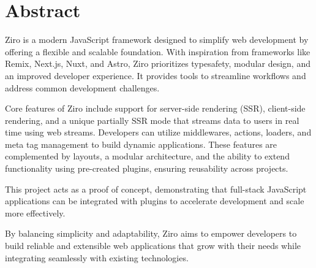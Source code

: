 \section{Abstract}

Ziro is a modern JavaScript framework designed to simplify web development by offering a flexible and scalable foundation. With inspiration from frameworks like Remix, Next.js, Nuxt, and Astro, Ziro prioritizes typesafety, modular design, and an improved developer experience. It provides tools to streamline workflows and address common development challenges.

Core features of Ziro include support for server-side rendering (SSR), client-side rendering, and a unique partially SSR mode that streams data to users in real time using web streams. Developers can utilize middlewares, actions, loaders, and meta tag management to build dynamic applications. These features are complemented by layouts, a modular architecture, and the ability to extend functionality using pre-created plugins, ensuring reusability across projects.

This project acts as a proof of concept, demonstrating that full-stack JavaScript applications can be integrated with plugins to accelerate development and scale more effectively.

By balancing simplicity and adaptability, Ziro aims to empower developers to build reliable and extensible web applications that grow with their needs while integrating seamlessly with existing technologies.

\pagebreak
